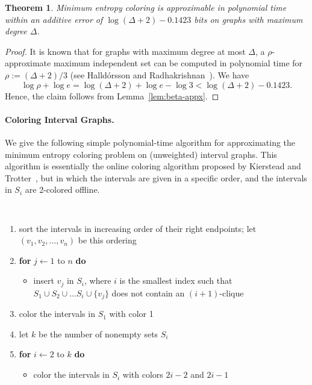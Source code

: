 \documentclass[10pt,a4paper]{article}
\newtheorem{theorem}{Theorem}
\begin{document}
\begin{theorem}
\label{thm:greedcol}
Minimum entropy coloring is approximable in polynomial time within an additive error of $\log (\Delta + 2) - 0.1423$ bits on graphs with maximum degree $\Delta$.
\end{theorem}
\begin{proof}
It is known that for graphs with maximum degree at most $\Delta$, a $\rho$-approximate maximum 
independent set can be computed in polynomial time for $\rho := (\Delta  + 2)/3$
(see Halld\'orsson and Radhakrishnan~\cite{greed}).
We have
$$
\log \rho + \log e = \log (\Delta  + 2) + \log e - \log 3 < \log(\Delta  + 2) - 0.1423.
$$
Hence, the claim follows from Lemma~\ref{lem:beta-appx}.
\end{proof}

\paragraph{Coloring Interval Graphs.}

We give the following simple polynomial-time algorithm for approximating the minimum entropy coloring problem on
(unweighted) interval graphs. This algorithm is essentially the online coloring algorithm proposed by Kierstead and Trotter~\cite{KT},
but in which the intervals are given in a specific order, and the intervals in $S_i$ are 2-colored offline.

{\tt
\begin{enumerate}
\item sort the intervals in increasing order of their right endpoints; let $(v_1, v_2,\ldots ,v_n)$ be this ordering
\item {\bf for} $j\gets 1$ to $n$ {\bf do}
\begin{itemize}
\item insert $v_j$ in $S_i$, where $i$ is the smallest index such that 
$S_1\cup S_2\cup\ldots S_i\cup\{ v_j\}$ does not contain an $(i+1)$-clique
\end{itemize}
\item color the intervals in $S_1$ with color 1
\item let $k$ be the number of nonempty sets $S_i$
\item {\bf for} $i\gets 2$ to $k$ {\bf do}
\begin{itemize}
\item \label{2col} color the intervals in $S_i$ with colors $2i-2$ and $2i-1$
\end{itemize}
\end{enumerate}
}
\end{document}
